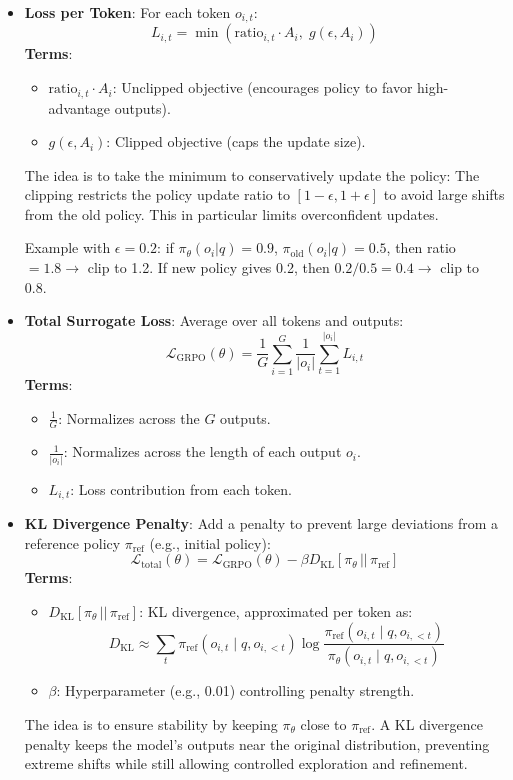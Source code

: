 \documentclass{article}
\begin{document}
\begin{itemize}
\item \textbf{Loss per Token}: For each token \( o_{i,t} \):
\[
L_{i,t} = \min \left( \text{ratio}_{i,t} \cdot A_i, \; g(\epsilon, A_i) \right)
\]
\textbf{Terms}:
\begin{itemize}
    \item \( \text{ratio}_{i,t} \cdot A_i \): Unclipped objective (encourages policy to favor high-advantage outputs).
    \item \( g(\epsilon, A_i) \): Clipped objective (caps the update size).
\end{itemize}
The idea is to take the minimum to conservatively update the policy: The clipping restricts the policy update ratio to \([1 - \epsilon, 1 + \epsilon]\) to avoid large shifts from the old policy. This in particular limits overconfident updates.

Example with \(\epsilon = 0.2\): if \(\pi_{\theta}(o_i|q) = 0.9\), \(\pi_{\text{old}}(o_i|q) = 0.5\), then ratio \(= 1.8 \rightarrow\) clip to 1.2. If new policy gives 0.2, then \(0.2 / 0.5 = 0.4 \rightarrow\) clip to 0.8.



\item \textbf{Total Surrogate Loss}: Average over all tokens and outputs:
\[
\mathcal{L}_{\text{GRPO}}(\theta) = \frac{1}{G} \sum_{i=1}^{G} \frac{1}{|o_i|} \sum_{t=1}^{|o_i|} L_{i,t}
\]
\textbf{Terms}:
\begin{itemize}
    \item \( \frac{1}{G} \): Normalizes across the \( G \) outputs.
    \item \( \frac{1}{|o_i|} \): Normalizes across the length of each output \( o_i \).
    \item \( L_{i,t} \): Loss contribution from each token.
\end{itemize}
\item \textbf{KL Divergence Penalty}: Add a penalty to prevent large deviations from a reference policy \( \pi_{\text{ref}} \) (e.g., initial policy):
\[
\mathcal{L}_{\text{total}}(\theta) = \mathcal{L}_{\text{GRPO}}(\theta) - \beta D_{\text{KL}}[\pi_\theta \,||\, \pi_{\text{ref}}]
\]
\textbf{Terms}:
\begin{itemize}
    \item \( D_{\text{KL}}[\pi_\theta \,||\, \pi_{\text{ref}}] \): KL divergence, approximated per token as:
    \[
    D_{\text{KL}} \approx \sum_{t} \pi_{\text{ref}}(o_{i,t} \mid q, o_{i,<t}) \log \frac{\pi_{\text{ref}}(o_{i,t} \mid q, o_{i,<t})}{\pi_\theta(o_{i,t} \mid q, o_{i,<t})}
    \]
    \item \( \beta \): Hyperparameter (e.g., 0.01) controlling penalty strength.
\end{itemize}
The idea is to ensure stability by keeping \( \pi_\theta \) close to \( \pi_{\text{ref}} \). A KL divergence penalty keeps the model’s outputs near the original distribution, preventing extreme shifts while still allowing controlled exploration and refinement.


\end{itemize}
\end{document}
